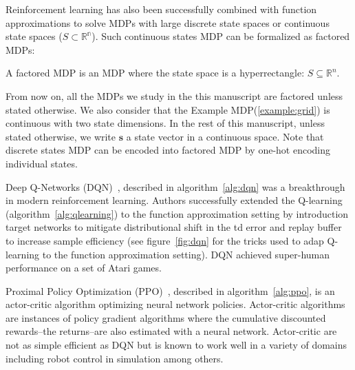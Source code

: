 Reinforcement learning has also been successfully combined with function approximations \cite{td-gammon} to solve MDPs with large discrete state spaces or continuous state spaces ($S \subset \mathbb{R^n}$).
Such continuous states MDP can be formalized as factored MDPs\cite{fmdp}:

\begin{definition} A factored MDP is an MDP\cite{def:mdp} where the state space is a hyperrectangle: $S\subseteq \mathbb{R}^n$.
\end{definition}

From now on, all the MDPs we study in the this manuscript are factored unless stated otherwise. 
We also consider that the Example MDP(\ref{example:grid}) is continuous with two state dimensions.
In the rest of this manuscript, unless stated otherwise, we write $\boldsymbol{s}$ a state vector in a continuous space.
Note that discrete states MDP can be encoded into factored MDP by one-hot encoding individual states.

Deep Q-Networks (DQN)~\cite{dqn}, described in algorithm~\ref{alg:dqn} was a breakthrough in modern reinforcement learning.
Authors successfully extended the Q-learning (algorithm~\ref{alg:qlearning}) to the function approximation setting by introduction target networks to mitigate distributional shift in the td error and replay buffer to increase sample efficiency (see figure~\ref{fig:dqn} for the tricks used to adap Q-learning to the function approximation setting).
DQN achieved super-human performance on a set of Atari games.

Proximal Policy Optimization (PPO)~\cite{ppo}, described in algorithm~\ref{alg:ppo}, is an actor-critic algorithm\cite{pg_sutton} optimizing neural network policies. 
Actor-critic algorithms are instances of policy gradient algorithms where the cumulative discounted rewards--the returns--are also estimated with a neural network. 
Actor-critic are not as simple efficient as DQN but is known to work well in a variety of domains including robot control in simulation among others.

